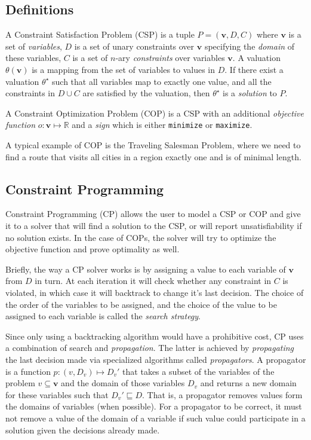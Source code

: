 \documentclass[letterpaper]{article} %
\begin{document}
\subsection{Definitions}
A Constraint Satisfaction Problem (CSP) is a tuple $P = (\boldsymbol{v},D,C)$ 
where $\boldsymbol{v}$ is a 
set of \emph{variables}, $D$ is a set of unary constraints over 
$\boldsymbol{v}$ specifying 
the \emph{domain} of these variables, $C$ is a set of $n$-ary 
\emph{constraints} over variables $\boldsymbol{v}$.
A valuation $\theta(\boldsymbol{v})$ is a mapping from the set of variables to 
values in $D$. If there exist a valuation $\theta^\star$ such that all 
variables map 
to exactly one value, and all the constraints in $D\cup C$ are satisfied by the 
valuation, then $\theta^\star$ is a \emph{solution} to $P$.

A Constraint Optimization Problem (COP) is a CSP with an additional 
\emph{objective function} $o : \boldsymbol{v} \mapsto \mathbb{R}$ and a 
\emph{sign} which is either \verb|minimize| or \verb|maximize|. 

A typical example of COP is the Traveling Salesman Problem, where we need to 
find a route that visits all cities in a region exactly one and is of minimal 
length.

\subsection{Constraint Programming}
Constraint Programming (CP) allows the user to model a CSP or COP and give it 
to a 
solver that will find a solution to the CSP, or will report unsatisfiability if 
no solution exists. In the case of COPs, the solver will try to optimize 
the objective function and prove optimality as well.

Briefly, the way a CP solver works is by assigning a value to each variable of 
$\boldsymbol{v}$ from $D$ in turn. At each iteration it will check whether any 
constraint in $C$ is violated, in which case it will backtrack to change it's 
last decision. The choice of the order of the variables to be assigned, and the 
choice of the value to be assigned to each variable is called the \emph{search 
strategy}.

Since only using a backtracking algorithm would have a prohibitive cost, CP 
uses a combination of search and \emph{propagation}. The latter is achieved by 
\emph{propagating} the last decision made via specialized algorithms called 
\emph{propagators}. A propagator is a function $p : (v, D_v) \mapsto D_v'$ that 
takes a subset of the variables of the problem $v \subseteq \boldsymbol{v}$ and 
the domain of those variables $D_v$ and returns a new domain for these 
variables 
such that $D_v' \sqsubseteq D$. That is, a propagator removes values form the 
domains of variables (when possible). For a propagator to be correct, it must 
not remove a value of the domain of a variable if such value could participate 
in a solution given the decisions already made.
\end{document}
